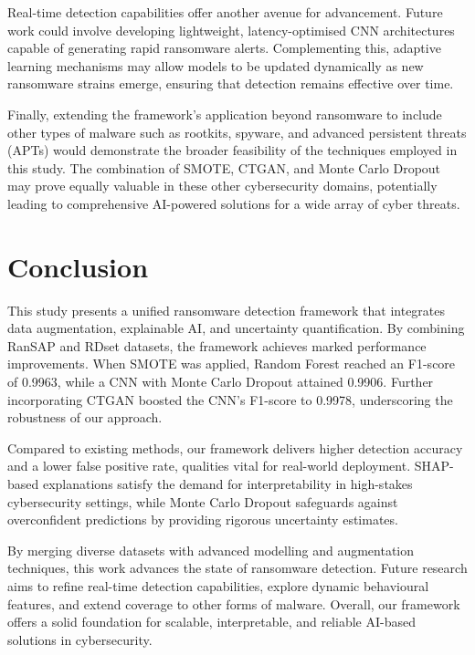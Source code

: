Real-time detection capabilities offer another avenue for advancement. Future work could involve developing lightweight, latency-optimised CNN architectures capable of generating rapid ransomware alerts. Complementing this, adaptive learning mechanisms may allow models to be updated dynamically as new ransomware strains emerge, ensuring that detection remains effective over time.

Finally, extending the framework’s application beyond ransomware to include other types of malware such as rootkits, spyware, and advanced persistent threats (APTs) would demonstrate the broader feasibility of the techniques employed in this study. The combination of SMOTE, CTGAN, and Monte Carlo Dropout may prove equally valuable in these other cybersecurity domains, potentially leading to comprehensive AI-powered solutions for a wide array of cyber threats.

\section{Conclusion}
\label{sec:Conclusion}

This study presents a unified ransomware detection framework that integrates data augmentation, explainable AI, and uncertainty quantification. By combining RanSAP and RDset datasets, the framework achieves marked performance improvements. When SMOTE  was applied, Random Forest reached an F1-score of 0.9963, while a CNN with Monte Carlo Dropout  attained 0.9906.  Further incorporating CTGAN  boosted the CNN’s F1-score to 0.9978, underscoring the robustness of our approach.

Compared to existing methods, our framework delivers higher detection accuracy and a lower false positive rate, qualities vital for real-world deployment. SHAP-based explanations satisfy the demand for interpretability in high-stakes cybersecurity settings, while Monte Carlo Dropout safeguards against overconfident predictions by providing rigorous uncertainty estimates.

By merging diverse datasets with advanced  modelling and augmentation techniques, this work advances the state of ransomware detection. Future research aims to refine real-time detection capabilities, explore dynamic behavioural features, and extend coverage to other forms of malware.  Overall, our framework offers a solid foundation for scalable, interpretable, and reliable AI-based solutions in cybersecurity.


